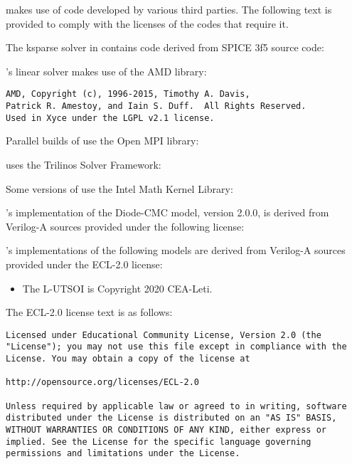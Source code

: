 \Xyce{} makes use of code developed by various third parties.  The following
text is provided to comply with the licenses of the codes that require it.

The ksparse solver in \Xyce{} contains code derived from SPICE 3f5 source code:


\Xyce{}'s linear solver makes use of the AMD library:
\begin{verbatim}
AMD, Copyright (c), 1996-2015, Timothy A. Davis,
Patrick R. Amestoy, and Iain S. Duff.  All Rights Reserved.
Used in Xyce under the LGPL v2.1 license.
\end{verbatim}

Parallel builds of \Xyce{} use the Open MPI library:


\Xyce{} uses the Trilinos Solver Framework:


Some versions of \Xyce{} use the Intel Math Kernel Library:


\Xyce{}'s implementation of the Diode-CMC model, version 2.0.0, is derived from
Verilog-A sources provided under the following license:


\Xyce{}'s implementations of the following models are derived from Verilog-A
sources provided under the ECL-2.0 license:
\begin{itemize}[noitemsep]
     \item The L-UTSOI is Copyright 2020 CEA-Leti.
\end{itemize}
The ECL-2.0 license text is as follows:
\begin{verbatim}
Licensed under Educational Community License, Version 2.0 (the
"License"); you may not use this file except in compliance with the
License. You may obtain a copy of the license at

http://opensource.org/licenses/ECL-2.0

Unless required by applicable law or agreed to in writing, software
distributed under the License is distributed on an "AS IS" BASIS,
WITHOUT WARRANTIES OR CONDITIONS OF ANY KIND, either express or
implied. See the License for the specific language governing
permissions and limitations under the License.
\end{verbatim}

